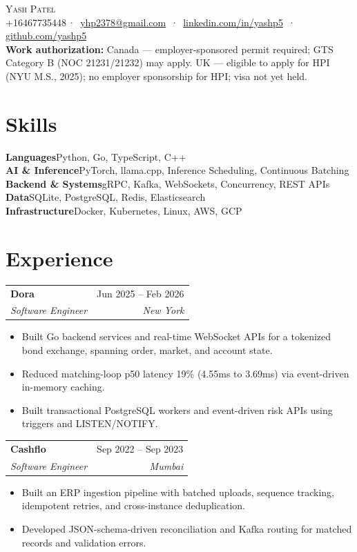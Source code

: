 \documentclass[letterpaper,12pt]{article}
\makeatletter
\newcommand{\entry}[4]{%
  \begin{tabularx}{\textwidth}{@{}X@{}r@{}}
    \textbf{#1} & {\small\color{muted}#2} \\
    {\small\itshape #3} & {\small\itshape\color{muted}#4} \\
  \end{tabularx}\vspace{3pt}
}
\newenvironment{bullets}
  {\begin{itemize}[leftmargin=1.1em, itemsep=0pt, topsep=0pt, parsep=0pt, label={\color{muted}\footnotesize\textbullet}]\fontsize{11}{13.0}\selectfont}
  {\end{itemize}\vspace{-3pt}}
\newcommand{\skill}[2]{\textbf{#1}\enspace {\color{muted}·}\enspace #2\\[-1pt]}
\makeatother
\begin{document}
\begin{center}
  {\huge\scshape Yash Patel}\\[1pt]
  {\small
    +16467735448\,{\color{muted}·}\,
    \href{mailto:yhp2378@gmail.com}{yhp2378@gmail.com}
    \,{\color{muted}·}\,
    \href{https://www.linkedin.com/in/yashp5/}{linkedin.com/in/yashp5}
    \,{\color{muted}·}\,
    \href{https://github.com/yashp5}{github.com/yashp5}
  }\\[2pt]
  {\fontsize{9}{10.5}\selectfont\color{muted}
    \textbf{Work authorization:}\enspace
    \ifdefined\CANADA
      Canada --- employer-sponsored permit required; GTS Category B (NOC 21231/21232) may apply.
    \else
      UK --- eligible to apply for HPI (NYU M.S., 2025); no employer sponsorship for HPI; visa not yet held.
    \fi
  }
\end{center}
\vspace{-12pt}

\section{Skills}\vspace{1.2pt}
{\small
\skill{Languages}{Python, Go, TypeScript, C++}
\skill{AI \& Inference}{PyTorch, llama.cpp, Inference Scheduling, Continuous Batching}
\skill{Backend \& Systems}{gRPC, Kafka, WebSockets, Concurrency, REST APIs}
\skill{Data}{SQLite, PostgreSQL, Redis, Elasticsearch}
\skill{Infrastructure}{Docker, Kubernetes, Linux, AWS, GCP}
}

\section{Experience}

\entry{Dora}{Jun 2025 -- Feb 2026}{Software Engineer}{New York}
\begin{bullets}
  \item Built Go backend services and real-time WebSocket APIs for a tokenized bond exchange, spanning order, market, and account state.
  \item Reduced matching-loop p50 latency 19\% (4.55ms to 3.69ms) via event-driven in-memory caching.
  \item Built transactional PostgreSQL workers and event-driven risk APIs using triggers and LISTEN/NOTIFY.
\end{bullets}

\vspace{7pt}
\entry{Cashflo}{Sep 2022 -- Sep 2023}{Software Engineer}{Mumbai}
\begin{bullets}
  \item Built an ERP ingestion pipeline with batched uploads, sequence tracking, idempotent retries, and cross-instance deduplication.
  \item Developed JSON-schema-driven reconciliation and Kafka routing for matched records and validation errors.
\end{bullets}
\end{document}
